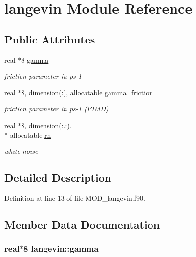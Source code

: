 \hypertarget{classlangevin}{\section{langevin Module Reference}
\label{classlangevin}
}
\subsection*{Public Attributes}
\begin{DoxyCompactItemize}
\item 
real $\ast$8 \hyperlink{classlangevin_afb560ffa4e59d6d1ce8b79fd205394a9}{gamma}
\begin{DoxyCompactList}\small\item\em friction parameter in ps-\/1 \end{DoxyCompactList}\item 
real $\ast$8, dimension(\-:), allocatable \hyperlink{classlangevin_a772d30ab950f2b2f9a18a5636e511ba2}{gamma\-\_\-friction}
\begin{DoxyCompactList}\small\item\em friction parameter in ps-\/1 (P\-I\-M\-D) \end{DoxyCompactList}\item 
real $\ast$8, dimension(\-:,\-:), \\*
allocatable \hyperlink{classlangevin_add2b2e42216c6f66497043320a4a6a0f}{rn}
\begin{DoxyCompactList}\small\item\em white noise \end{DoxyCompactList}\end{DoxyCompactItemize}


\subsection{Detailed Description}


Definition at line 13 of file M\-O\-D\-\_\-langevin.\-f90.



\subsection{Member Data Documentation}
\hypertarget{classlangevin_afb560ffa4e59d6d1ce8b79fd205394a9}{
\subsubsection[{gamma}]{\setlength{\rightskip}{0pt plus 5cm}real$\ast$8 langevin\-::gamma}}\label{classlangevin_afb560ffa4e59d6d1ce8b79fd205394a9}



